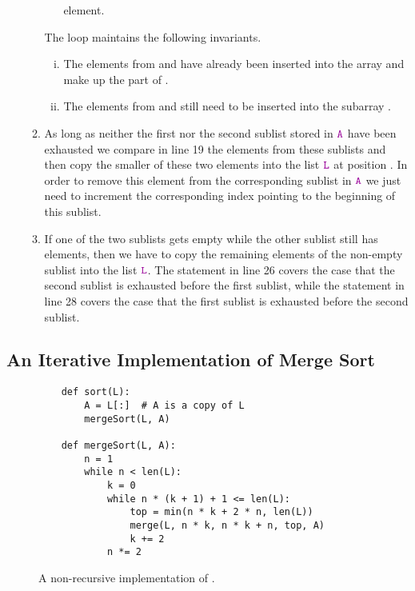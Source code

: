 \begin{enumerate}
\begin{enumerate}
\begin{itemize}
                  element.
            \end{itemize}
            The  loop maintains the following invariants.
            \begin{enumerate}[(i)]
            \item The elements from  and  have already been inserted
                  into the array  and make up the part  of .
            \item The elements from  and  still need to be inserted into
                  the subarray .
            \end{enumerate}
      \item As long as neither the first nor the second sublist stored in $\mytt{A}$ have been exhausted
            we compare in line 19 the elements from these sublists and then copy the smaller of these
            two elements into the list $\mytt{L}$ at position .
            In order to remove this element from the corresponding sublist in $\mytt{A}$ we just need to
            increment the corresponding index pointing to the beginning of this sublist.
      \item If one of the two sublists gets empty while the other sublist still has elements, then we have
            to copy the remaining elements of the non-empty sublist into the list $\mytt{L}$.
            The statement in line 26 covers the case that the second sublist is exhausted before 
            the first sublist, while the statement in line 28 covers the case that the first
            sublist is exhausted before the second sublist.
      \end{enumerate}
\end{enumerate}

\subsection{An Iterative Implementation of Merge Sort}

\begin{figure}[!ht]
  \centering
\begin{verbatim}
    def sort(L):
        A = L[:]  # A is a copy of L
        mergeSort(L, A)

    def mergeSort(L, A):
        n = 1
        while n < len(L):
            k = 0
            while n * (k + 1) + 1 <= len(L):
                top = min(n * k + 2 * n, len(L))
                merge(L, n * k, n * k + n, top, A)
                k += 2    
            n *= 2 
\end{verbatim}
\vspace*{-0.3cm}
  \caption{A non-recursive implementation of .}
  \label{fig:merge-sort-nr.stlx}
\end{figure}

